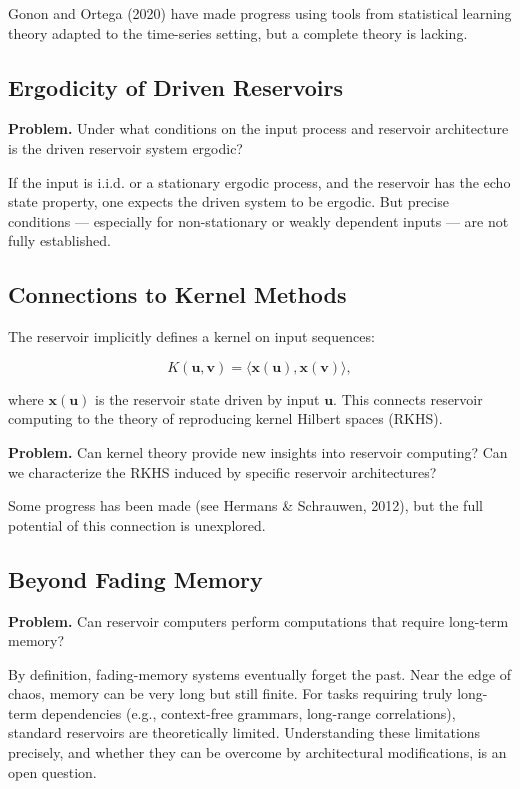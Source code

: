Gonon and Ortega (2020) have made progress using tools from statistical learning theory adapted to the time-series setting, but a complete theory is lacking.

\subsection{Ergodicity of Driven Reservoirs}\label{sec:17.8.5}

\textbf{Problem.} Under what conditions on the input process and reservoir architecture is the driven reservoir system ergodic?

If the input is i.i.d. or a stationary ergodic process, and the reservoir has the echo state property, one expects the driven system to be ergodic. But precise conditions --- especially for non-stationary or weakly dependent inputs --- are not fully established.

\subsection{Connections to Kernel Methods}\label{sec:17.8.6}

The reservoir implicitly defines a kernel on input sequences:

\[
K(\mathbf{u}, \mathbf{v}) = \langle \mathbf{x}(\mathbf{u}), \mathbf{x}(\mathbf{v}) \rangle,
\]

where $\mathbf{x}(\mathbf{u})$ is the reservoir state driven by input $\mathbf{u}$. This connects reservoir computing to the theory of reproducing kernel Hilbert spaces (RKHS).

\textbf{Problem.} Can kernel theory provide new insights into reservoir computing? Can we characterize the RKHS induced by specific reservoir architectures?

Some progress has been made (see Hermans \& Schrauwen, 2012), but the full potential of this connection is unexplored.

\subsection{Beyond Fading Memory}\label{sec:17.8.7}

\textbf{Problem.} Can reservoir computers perform computations that require long-term memory?

By definition, fading-memory systems eventually forget the past. Near the edge of chaos, memory can be very long but still finite. For tasks requiring truly long-term dependencies (e.g., context-free grammars, long-range correlations), standard reservoirs are theoretically limited. Understanding these limitations precisely, and whether they can be overcome by architectural modifications, is an open question.


